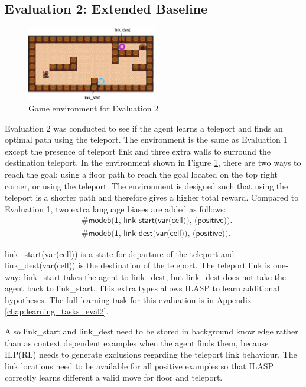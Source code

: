 \subsection{Evaluation 2: Extended Baseline}
\label{subsec:experiement2_setup}

\begin{figure}[!htb]
\centering
\includegraphics[width=0.5\textwidth]{./figures/experiment2_setup}
\caption{Game environment for Evaluation 2}
\label{experiment2}
\end{figure}
Evaluation 2 was conducted to see if the agent learns a teleport and finds an optimal path using the teleport. The environment is the same as Evaluation 1 except the presence of teleport link and three extra walls to surround the destination teleport.
In the environment shown in Figure \ref{experiment2},
there are two ways to reach the goal: using a floor path to reach the goal located on the top right corner, or using the teleport.
The environment is designed such that using the teleport is a shorter path and therefore gives a higher total reward.
Compared to Evaluation 1, two extra language biases are added as follows:
\begin{equation*}
\begin{split}
&\textsf{\#modeb(1, link\_start(var(cell)), (positive)).}\\
&\textsf{\#modeb(1, link\_dest(var(cell)), (positive)).}
\end{split}
\end{equation*}

\textsf{link\_start(var(cell))} is a state for departure of the teleport and \textsf{link\_dest(var(cell))} is the destination of the teleport. 
The teleport link is one-way: \textsf{link\_start} takes the agent to \textsf{link\_dest}, but \textsf{link\_dest} does not take the agent back to \textsf{link\_start}.
This extra types allows ILASP to learn additional hypotheses.
The full learning task for this evaluation is in Appendix \ref{chap:learning_tasks_eval2}.

Also \textsf{link\_start} and \textsf{link\_dest} need to be stored in background knowledge rather than as context dependent examples when the agent finds them, 
because ILP(RL) needs to generate exclusions regarding the teleport link behaviour.
The link locations need to be available for all positive examples so that ILASP correctly learns different a valid move for floor and teleport.

